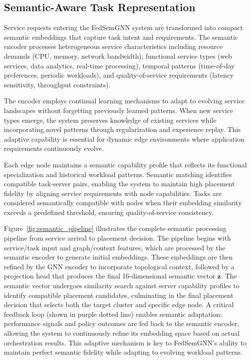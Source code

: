 \subsection{Semantic-Aware Task Representation}
\label{subsec:semantic_representation}

Service requests entering the FedSemGNN system are transformed into compact semantic embeddings that capture task intent and requirements. The semantic encoder processes heterogeneous service characteristics including resource demands (CPU, memory, network bandwidth), functional service types (web services, data analytics, real-time processing), temporal patterns (time-of-day preferences, periodic workloads), and quality-of-service requirements (latency sensitivity, throughput constraints).

The encoder employs continual learning mechanisms to adapt to evolving service landscapes without forgetting previously learned patterns. When new service types emerge, the system preserves knowledge of existing services while incorporating novel patterns through regularization and experience replay. This adaptive capability is essential for dynamic edge environments where application requirements continuously evolve.

Each edge node maintains a semantic capability profile that reflects its functional specialization and historical workload patterns. Semantic matching identifies compatible task-server pairs, enabling the system to maintain high placement fidelity by aligning service requirements with node capabilities. Tasks are considered semantically compatible with nodes when their embedding similarity exceeds a predefined threshold, ensuring quality-of-service consistency.

Figure~\ref{fig:semantic_pipeline} illustrates the complete semantic processing pipeline from service arrival to placement decision. The pipeline begins with service/task input and graph/context features, which are processed by the semantic encoder to generate initial embeddings. These embeddings are then refined by the GNN encoder to incorporate topological context, followed by a projection head that produces the final 16-dimensional semantic vector $\mathbf{z}$. The semantic vector undergoes similarity search against server capability profiles to identify compatible placement candidates, culminating in the final placement decision that selects both the target cluster and specific edge node. A critical feedback loop (shown in purple dotted line) enables semantic adaptation: performance signals and policy outcomes are fed back to the semantic encoder, allowing the system to continuously refine its embedding space based on actual orchestration results. This adaptive mechanism is key to FedSemGNN's ability to maintain perfect semantic fidelity while adapting to evolving workload patterns.

